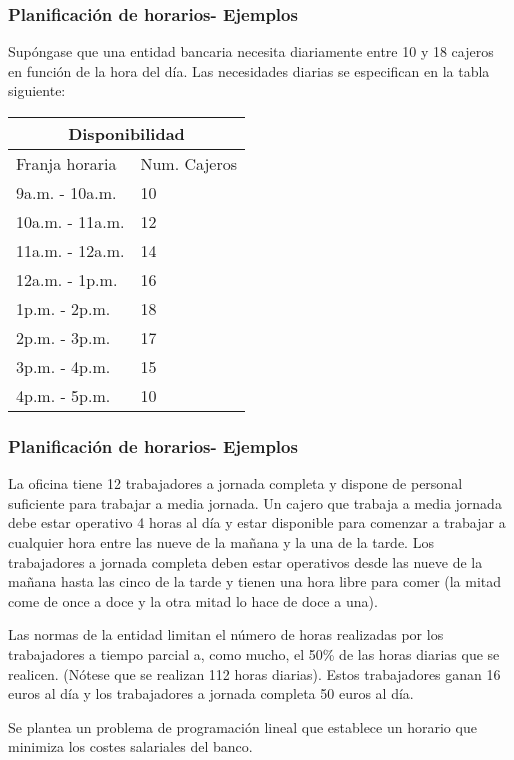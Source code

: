 \documentclass{beamer}
\begin{document}
\begin{frame}
\frametitle{Planificaci\'on de horarios- Ejemplos}
Sup\'ongase que una entidad bancaria necesita diariamente entre 10 y 18 cajeros en funci\'on de la hora del d\'ia. Las necesidades diarias se especifican en la tabla siguiente:
\begin{tabular}{ |p{4cm}||p{4cm}|  }
 \hline
 \multicolumn{2}{|c|}{Disponibilidad} \\
 \hline
 Franja horaria& Num. Cajeros\\
 \hline
 9a.m. - 10a.m.   & 10\\
 10a.m. - 11a.m.   & 12\\
 11a.m. - 12a.m.   & 14\\
 12a.m. - 1p.m.   & 16\\
 1p.m. - 2p.m.   & 18\\
 2p.m. - 3p.m.   & 17\\
 3p.m. - 4p.m.   & 15\\
 4p.m. - 5p.m.   & 10\\

 \hline
\end{tabular}
\end{frame}


\begin{frame}
\frametitle{Planificaci\'on de horarios- Ejemplos}
La oficina tiene 12 trabajadores a jornada completa y dispone de personal suficiente para trabajar a media jornada. Un cajero que trabaja a media jornada debe estar operativo 4 horas al d\'ia y estar disponible para comenzar a trabajar a cualquier hora entre las nueve de la ma\~nana y la una de la tarde. Los trabajadores a jornada completa deben estar operativos desde las nueve de la ma\~nana hasta las cinco de la tarde y tienen una hora libre para comer (la mitad come de once a doce y la otra mitad lo hace de doce a una).

Las normas de la entidad limitan el n\'umero de horas realizadas por los trabajadores a tiempo parcial a, como mucho, el 50\% de las horas diarias que se realicen. (N\'otese que se realizan 112 horas diarias). Estos trabajadores ganan 16 euros al d\'ia y los trabajadores a jornada completa 50 euros al d\'ia.

Se plantea un problema de programaci\'on lineal que establece un horario que minimiza los costes salariales del banco.
\end{frame}
\end{document}
